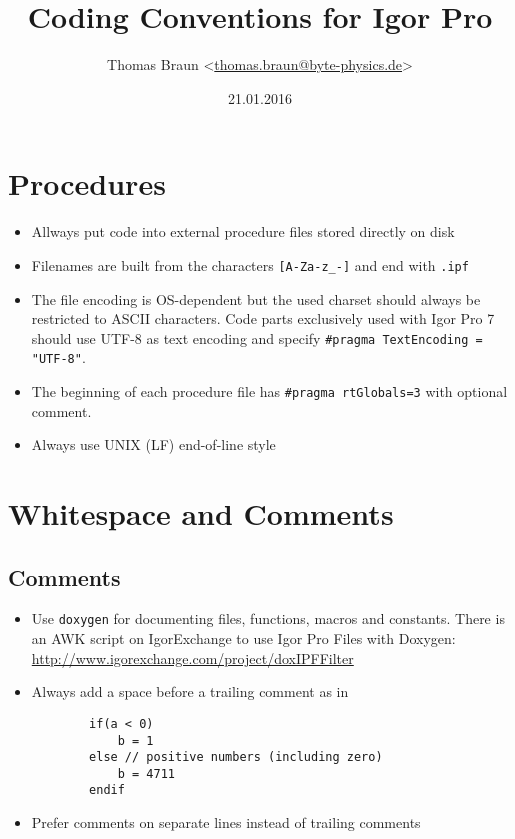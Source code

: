 \documentclass{scrartcl}
\date{21.01.2016}
\author{Thomas Braun <\url{thomas.braun@byte-physics.de}>}
\title{Coding Conventions for Igor Pro}
\begin{document}
%
\maketitle
%
\section{Procedures}
%
\begin{itemize}
	\item Allways put code into external procedure files stored directly on disk
%
	\item Filenames are built from the characters \texttt{[A-Za-z_-]} and end with \texttt{.ipf}
%
	\item The file encoding is OS-dependent but the used charset should always be restricted to ASCII characters.
		  Code parts exclusively used with Igor Pro 7 should use UTF-8 as text encoding and specify \texttt{#pragma TextEncoding = "UTF-8"}.
%
	\item The beginning of each procedure file has \texttt{#pragma rtGlobals=3} with optional comment.
%
	\item Always use UNIX (LF) end-of-line style
\end{itemize}
%
\section{Whitespace and Comments}
%
\subsection*{Comments}
%
\begin{itemize}
	\item Use \texttt{doxygen} for documenting files, functions, macros and constants.\newline
	There is an AWK script on IgorExchange to use Igor Pro Files with Doxygen:\newline
	\url{http://www.igorexchange.com/project/doxIPFFilter}
%
	\item Always add a space before a trailing comment as in
	\begin{verbatim}
		if(a < 0)
			b = 1
		else // positive numbers (including zero)
			b = 4711
		endif
	\end{verbatim}
%
	\item Prefer comments on separate lines instead of trailing comments
%
\end{itemize}
%
\end{document}
